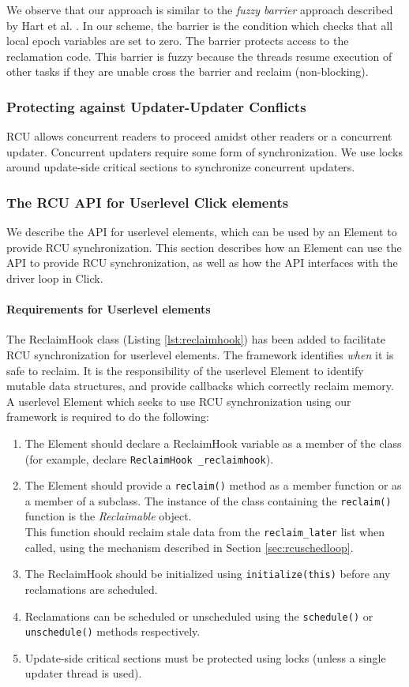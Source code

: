 \documentclass[a4paper]{article}
\begin{document}
We observe that our approach is similar to the \emph{fuzzy barrier} approach described by Hart et al. \cite{hart}. In our scheme, the barrier is the condition which checks that all local epoch variables are set to zero. The barrier protects access to the reclamation code. This barrier is fuzzy because the threads resume execution of other tasks if they are unable cross the barrier and reclaim (non-blocking).

\subsubsection{Protecting against Updater-Updater Conflicts}
RCU allows concurrent readers to proceed amidst other readers or a concurrent updater. Concurrent updaters require some form of synchronization. We use locks around update-side critical sections to synchronize concurrent updaters.

\subsubsection{The RCU API for Userlevel Click elements}
 We describe the API for userlevel elements, which can be used by an Element to provide RCU synchronization. This section describes how an Element can use the API to provide RCU synchronization, as well as how the API interfaces with the driver loop in Click.
\paragraph{Requirements for Userlevel elements}
 The ReclaimHook class (Listing \ref{lst:reclaimhook}) has been added to facilitate RCU synchronization for userlevel elements. The framework identifies \emph{when} it is safe to reclaim. It is the responsibility of the userlevel Element to identify mutable data structures, and provide callbacks which correctly reclaim memory. A userlevel Element which seeks to use RCU synchronization using our framework is required to do the following:
\begin{enumerate}
\item The Element should declare a ReclaimHook variable as a member of the class (for example, declare \texttt{ReclaimHook \_reclaimhook}).
\item The Element should provide a \texttt{reclaim()} method as a member function or as a member of a subclass. The instance of the class containing the \texttt{reclaim()} function is the \emph{Reclaimable} object. \\ This function should reclaim stale data from the \texttt{reclaim\_later} list when called, using the mechanism described in Section \ref{sec:rcuschedloop}.
\item The ReclaimHook should be initialized using \texttt{initialize(this)} before any reclamations are scheduled.
\item Reclamations can be scheduled or unscheduled using the \texttt{schedule()} or \\\texttt{unschedule()} methods respectively.
\item Update-side critical sections must be protected using locks (unless a single updater thread is used).
\end{enumerate}
 
\end{document}
